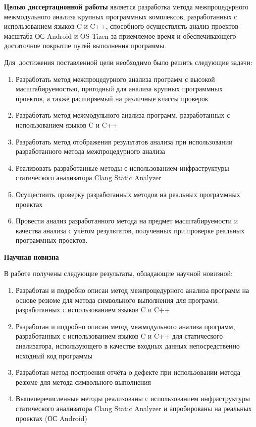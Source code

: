 \textbf{Целью диссертационной работы} является разработка метода межпроцедурного межмодульного анализа крупных программных комплексов, разработанных с использованием языков C и C++, способного осуществлять анализ проектов масштаба ОС Android и OS Tizen за приемлемое время и обеспечивающего достаточное покрытие путей выполнения программы.

Для~достижения поставленной цели необходимо было решить следующие задачи:
\begin{enumerate}
  \item Разработать метод межпроцедурного анализа программ с высокой масштабируемостью, пригодный для анализа крупных программных проектов, а также расширяемый на различные классы проверок
  \item Разработать метод межмодульного анализа программ, разработанных с использованием языков C и C++
  \item Разработать метод отображения результатов анализа при использовании разработанного метода межпроцедурного анализа
  \item Реализовать разработанные методы с использованием инфраструктуры статического анализатора Clang Static Analyzer
  \item Осуществить проверку разработанных методов на реальных программных проектах
  \item Провести анализ разработанного метода на предмет масштабируемости и качества анализа с учётом результатов, полученных при проверке реальных программных проектов.
\end{enumerate}

\textbf{Научная новизна}

В работе получены следующие результаты, обладающие научной новизной:
\begin{enumerate}
  \item Разработан и подробно описан метод межпроцедурного анализа программ на основе резюме для метода символьного выполнения для программ, разработанных с использованием языков C и C++
  \item Разработан и подробно описан метод межмодульного анализа программ, разработанных с использованием языков C и C++ для статического анализатора, использующего в качестве входных данных непосредственно исходный код программы
  \item Разработан метод построения отчёта о дефекте при использовании метода резюме для метода символьного выполнения
  \item Вышеперечисленные методы реализованы с использованием инфраструктуры статического анализатора Clang Static Analyzer и апробированы на реальных проектах (ОС Android)
\end{enumerate}

